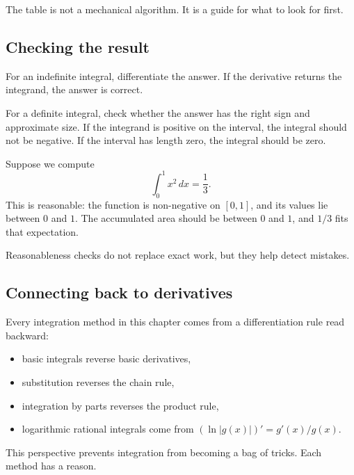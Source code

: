 The table is not a mechanical algorithm. It is a guide for what to look for first.

\subsection*{Checking the result}

For an indefinite integral, differentiate the answer. If the derivative returns the integrand, the answer is correct.

For a definite integral, check whether the answer has the right sign and approximate size. If the integrand is positive on the interval, the integral should not be negative. If the interval has length zero, the integral should be zero.

\begin{examplebox}
Suppose we compute
\[
\int_0^1 x^2\,dx=\frac13.
\]
This is reasonable: the function is non-negative on \([0,1]\), and its values lie between \(0\) and \(1\). The accumulated area should be between \(0\) and \(1\), and \(1/3\) fits that expectation.
\end{examplebox}

Reasonableness checks do not replace exact work, but they help detect mistakes.

\subsection*{Connecting back to derivatives}

Every integration method in this chapter comes from a differentiation rule read backward:
\begin{itemize}
\item basic integrals reverse basic derivatives,
\item substitution reverses the chain rule,
\item integration by parts reverses the product rule,
\item logarithmic rational integrals come from \((\ln|g(x)|)'=g'(x)/g(x)\).
\end{itemize}

This perspective prevents integration from becoming a bag of tricks. Each method has a reason.

